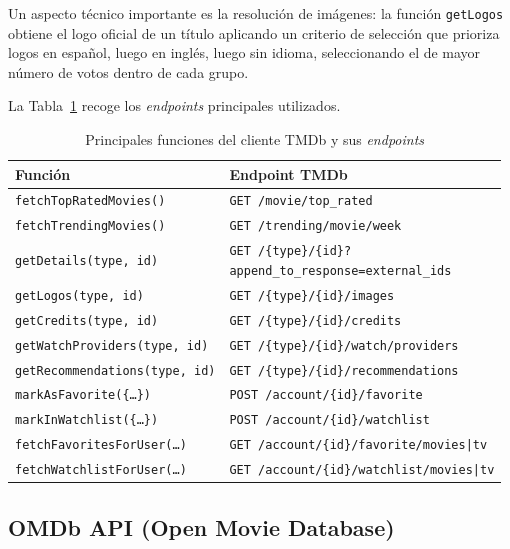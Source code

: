 Un aspecto técnico importante es la resolución de imágenes: la función \texttt{getLogos} obtiene el logo oficial de un título aplicando un criterio de selección que prioriza logos en español, luego en inglés, luego sin idioma, seleccionando el de mayor número de votos dentro de cada grupo.

La Tabla~\ref{tab:tmdb-endpoints} recoge los \textit{endpoints} principales utilizados.

\begin{table}[H]
\begin{center}
\begin{tabular}{| l | l |}
\hline
\textbf{Función} & \textbf{Endpoint TMDb} \\
\hline
\hline
\texttt{fetchTopRatedMovies()} & \texttt{GET /movie/top\_rated} \\
\hline
\texttt{fetchTrendingMovies()} & \texttt{GET /trending/movie/week} \\
\hline
\texttt{getDetails(type, id)} & \parbox[t]{0.62\linewidth}{\raggedright\strut\texttt{GET /\{type\}/\{id\}?}\\[2pt]\texttt{append\_to\_response=external\_ids}\strut} \\
\hline
\texttt{getLogos(type, id)} & \texttt{GET /\{type\}/\{id\}/images} \\
\hline
\texttt{getCredits(type, id)} & \texttt{GET /\{type\}/\{id\}/credits} \\
\hline
\texttt{getWatchProviders(type, id)} & \texttt{GET /\{type\}/\{id\}/watch/providers} \\
\hline
\texttt{getRecommendations(type, id)} & \texttt{GET /\{type\}/\{id\}/recommendations} \\
\hline
\texttt{markAsFavorite(\{\ldots\})} & \texttt{POST /account/\{id\}/favorite} \\
\hline
\texttt{markInWatchlist(\{\ldots\})} & \texttt{POST /account/\{id\}/watchlist} \\
\hline
\texttt{fetchFavoritesForUser(\ldots)} & \texttt{GET /account/\{id\}/favorite/movies|tv} \\
\hline
\texttt{fetchWatchlistForUser(\ldots)} & \texttt{GET /account/\{id\}/watchlist/movies|tv} \\
\hline
\end{tabular}
\caption{Principales funciones del cliente TMDb y sus \textit{endpoints}}
\label{tab:tmdb-endpoints}
\end{center}
\end{table}

\subsection{OMDb API (Open Movie Database)}

